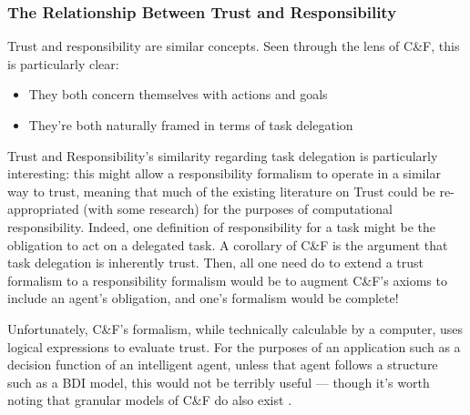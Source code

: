 
\subsubsection{The Relationship Between Trust and Responsibility}
Trust and responsibility are similar concepts. Seen through the lens of C\&F, this is particularly clear: 

\begin{itemize}
    \item They both concern themselves with actions and goals
    \item They're both naturally framed in terms of task delegation
\end{itemize}

Trust and Responsibility's similarity regarding task delegation is particularly interesting: this might allow a responsibility formalism to operate in a similar way to trust, meaning that much of the existing literature on Trust could be re-appropriated (with some research) for the purposes of computational responsibility. Indeed, one definition of responsibility for a task might be the obligation to act on a delegated task. A corollary of C\&F is the argument that task delegation is inherently trust. Then, all one need do to extend a trust formalism to a responsibility formalism would be to augment C\&F's axioms to include an agent's obligation, and one's formalism would be complete!\par

Unfortunately, C\&F's formalism, while technically calculable by a computer, uses logical expressions to evaluate trust. For the purposes of an application such as a decision function of an intelligent agent, unless that agent follows a structure such as a BDI model, this would not be terribly useful --- though it's worth noting that granular models of C\&F do also exist \parencite{lorini2008binary}.
